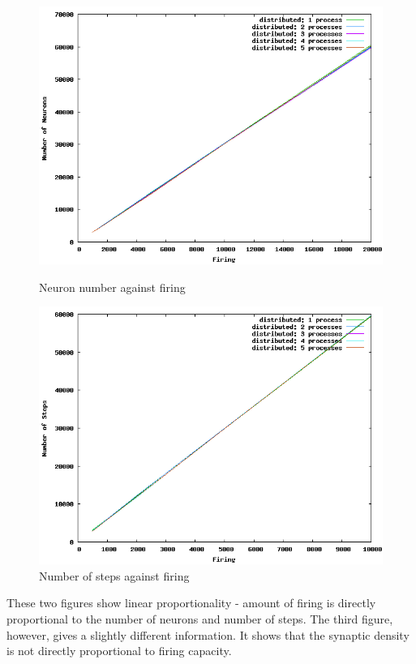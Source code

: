 \begin{figure}[ht]
\begin{minipage}[b]{0.5\linewidth}
\centering
\includegraphics[width=\textwidth]{images/evaluation/neuron_firing.png}
\caption{Neuron number against firing}
\label{fig:figure1}
\end{minipage}
\begin{minipage}[b]{0.5\linewidth}
\centering
\includegraphics[width=\textwidth]{images/evaluation/steps_firing.png}
\caption{Number of steps against firing}
\label{fig:figure3}
\end{minipage}
\end{figure}

These two figures show linear proportionality - amount of firing is directly proportional to the number of neurons and number of steps.
The third figure, however, gives a slightly different information. It shows that the synaptic density is not directly proportional to firing capacity.

